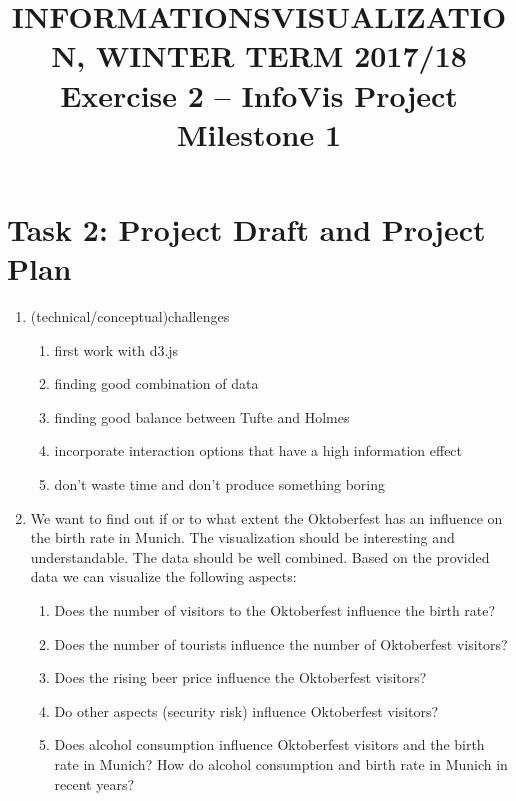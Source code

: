 \documentclass[11pt, twoside, BCOR=8mm, DIV=12]{scrartcl}
\title{{\Large INFORMATIONSVISUALIZATION, WINTER TERM 2017/18} \\ Exercise 2 – InfoVis Project Milestone 1}
\begin{document}
\maketitle
\section*{Task 2: Project Draft and Project Plan}
\begin{enumerate}[label=\alph*)]
\item (technical/conceptual)challenges
\begin{enumerate}[label=\arabic*)]
\item first work with d3.js
\item finding good combination of data
\item finding good balance between Tufte and Holmes
\item incorporate interaction options that have a high information effect
\item don't waste time and don't produce something boring
\end{enumerate}
\item We want to find out if or to what extent the Oktoberfest has an influence on the birth rate in Munich.
The visualization should be interesting and understandable.
The data should be well combined.
Based on the provided data we can visualize the following aspects:
\begin{enumerate}[label=\arabic*)]
\item Does the number of visitors to the Oktoberfest influence the birth rate?
\item Does the number of tourists influence the number of Oktoberfest visitors?
\item Does the rising beer price influence the Oktoberfest visitors?
\item Do other aspects (security risk) influence Oktoberfest visitors?
\item Does alcohol consumption influence Oktoberfest visitors and the birth rate in Munich? How do alcohol consumption and birth rate in Munich in recent years?

\end{enumerate}
\end{enumerate}
\end{document}
